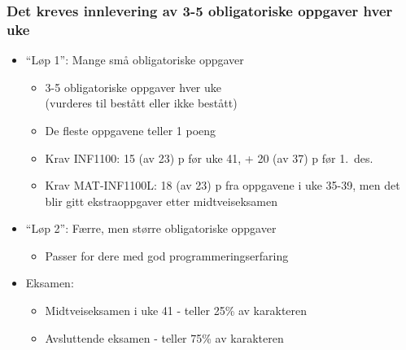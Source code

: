 \documentclass{beamer}
\begin{document}
\begin{frame}
\frametitle{Det kreves innlevering av 3-5 obligatoriske oppgaver hver uke}

\begin{block}{}
\begin{itemize}
  \item ``Løp 1'': Mange små obligatoriske oppgaver
\begin{itemize}

    \item 3-5 obligatoriske oppgaver hver uke\\
      (vurderes til bestått eller ikke bestått)

    \item De fleste oppgavene teller 1 poeng

    \item Krav INF1100: 15 (av 23) p før uke 41, + 20 (av 37) p før 1.~des.

    \item Krav MAT-INF1100L: 18 (av 23) p fra oppgavene i uke 35-39, men det blir gitt
      ekstraoppgaver etter midtveiseksamen

\end{itemize}

\noindent
  \item ``Løp 2'': Færre, men større obligatoriske oppgaver
\begin{itemize}

    \item Passer for dere med god programmeringserfaring

\end{itemize}

\noindent
  \item Eksamen:
\begin{itemize}

    \item Midtveiseksamen i uke 41 - teller 25\% av karakteren

    \item Avsluttende eksamen - teller 75\% av karakteren
\end{itemize}

\noindent
\end{itemize}

\noindent
\end{block}
\end{frame}
\end{document}
